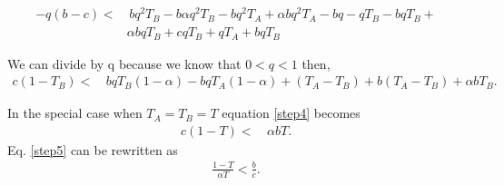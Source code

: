 \documentclass[12pt]{extarticle}
\begin{document}
\begin{equation} 
\begin{split}\label{step3}
 -q(b-c) < & \,  bq^2T_B-b\alpha q^2T_B - bq^2T_A +  \alpha bq^2T_A - bq - qT_B - bqT_B + \\
 & \alpha bqT_B +cqT_B + qT_A + bqT_B 
\end{split}
\end{equation}

We can divide by q because we know that $0<q<1$ then,
\begin{equation} 
\begin{split} \label{step4}
 c(1-T_B) < & \,  bqT_B(1-\alpha) - bqT_A(1-\alpha) + (T_A-T_B) + b(T_A - T_B) + \alpha bT_B.
\end{split}
\end{equation}

In the special case when $T_A = T_B = T$ equation \eqref{step4} becomes
\begin{equation} 
\begin{split}\label{step5}
c(1-T) < & \, \alpha bT.
\end{split}
\end{equation}
Eq. \eqref{step5} can be rewritten as
\begin{equation} 
\begin{split}
 \frac{1-T}{\alpha T} < \frac{b}{c}.
\end{split}
\end{equation}
\end{document}
